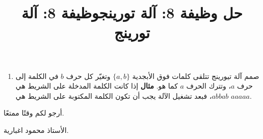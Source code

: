 \documentclass[14pt]{extarticle}
\title{حل وظيفة 8: آلة تورينج}
\title{وظيفة 8: آلة تورينج}
\begin{document}
\maketitle

\begin{enumerate}[itemsep=2em]
\item صمم آلة تيورينج تتلقى كلمات فوق الأبجدية \(\{a, b\}\) وتغيّر كل حرف $b$ في الكلمة إلى حرف $a$، وتترك الحرف $a$ كما هو.
\textbf{مثال} إذا كانت الكلمة المدخلة على الشريط هي \(abbab\)، فبعد تشغيل الآلة يجب أن تكون الكلمة المكتوبة على الشريط هي \(aaaaa\).
\end{enumerate}





\vspace{1cm}
\begin{flushleft}
أرجو لكم وقتًا ممتعًا.

الأستاذ محمود اغبارية.
\end{flushleft}
\end{document}
